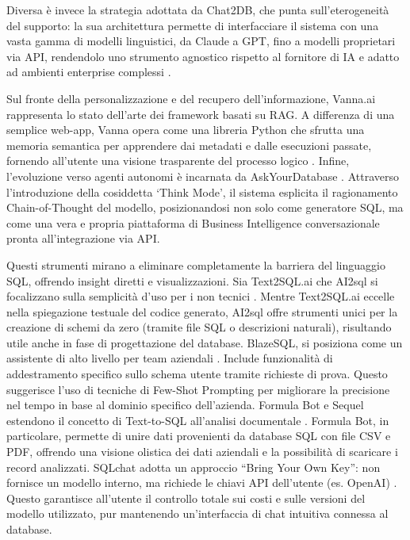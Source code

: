 Diversa è invece la strategia adottata da Chat2DB, che punta
sull'eterogeneità del supporto: la sua architettura permette di
interfacciare il sistema con una vasta gamma di modelli linguistici, da
Claude a GPT, fino a modelli proprietari via API, rendendolo uno
strumento agnostico rispetto al fornitore di IA e adatto ad ambienti
enterprise complessi \cite{chat2db}.

Sul fronte della personalizzazione e del recupero dell'informazione,
Vanna.ai rappresenta lo stato dell'arte dei framework basati su RAG. A
differenza di una semplice web-app, Vanna opera come una libreria Python
che sfrutta una memoria semantica per apprendere dai metadati e dalle
esecuzioni passate, fornendo all'utente una visione trasparente del
processo logico \cite{vanna_ai}. Infine, l'evoluzione verso agenti autonomi è incarnata
da AskYourDatabase \cite{askyourdatabase}. Attraverso l'introduzione della cosiddetta `Think
Mode', il sistema esplicita il ragionamento Chain-of-Thought del
modello, posizionandosi non solo come generatore SQL, ma come una vera e
propria piattaforma di Business Intelligence conversazionale pronta
all'integrazione via API.

Questi strumenti mirano a eliminare completamente la barriera del
linguaggio SQL, offrendo insight diretti e visualizzazioni. Sia
Text2SQL.ai che AI2sql si focalizzano sulla semplicità d'uso per i non
tecnici \cite{text2sql,ai2sql}. Mentre Text2SQL.ai eccelle nella spiegazione testuale del
codice generato, AI2sql offre strumenti unici per la creazione di schemi
da zero (tramite file SQL o descrizioni naturali), risultando utile
anche in fase di progettazione del database. BlazeSQL, si posiziona come
un assistente di alto livello per team aziendali \cite{blazesql}. Include funzionalità
di addestramento specifico sullo schema utente tramite richieste di
prova. Questo suggerisce l'uso di tecniche di Few-Shot Prompting per
migliorare la precisione nel tempo in base al dominio specifico
dell'azienda. Formula Bot e Sequel estendono il concetto di Text-to-SQL
all'analisi documentale \cite{formulabot,sequel}. Formula Bot, in particolare, permette di unire
dati provenienti da database SQL con file CSV e PDF, offrendo una
visione olistica dei dati aziendali e la possibilità di scaricare i
record analizzati. SQLchat adotta un approccio ``Bring Your Own Key'': 
non fornisce un modello interno, ma richiede le chiavi API
dell'utente (es. OpenAI) \cite{sqlchat}. Questo garantisce all'utente il controllo
totale sui costi e sulle versioni del modello utilizzato, pur mantenendo
un'interfaccia di chat intuitiva connessa al database.

